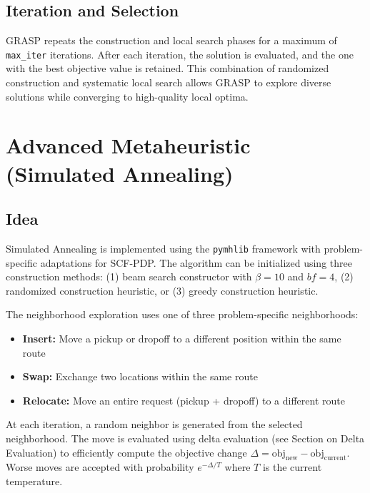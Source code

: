 \documentclass[a4paper]{scrartcl}
\begin{document}
\subsection{Iteration and Selection}
GRASP repeats the construction and local search phases for a maximum of \texttt{max\_iter} iterations. After each iteration, the solution is evaluated, and the one with the best objective value is retained. This combination of randomized construction and systematic local search allows GRASP to explore diverse solutions while converging to high-quality local optima.



\section{Advanced Metaheuristic (Simulated Annealing)}

\subsection{Idea}
Simulated Annealing is implemented using the \texttt{pymhlib} framework with problem-specific adaptations for SCF-PDP. The algorithm can be initialized using three construction methods: (1) beam search constructor with $\beta=10$ and $bf=4$, (2) randomized construction heuristic, or (3) greedy construction heuristic.

The neighborhood exploration uses one of three problem-specific neighborhoods:
\begin{itemize}
  \item \textbf{Insert:} Move a pickup or dropoff to a different position within the same route
  \item \textbf{Swap:} Exchange two locations within the same route
  \item \textbf{Relocate:} Move an entire request (pickup + dropoff) to a different route
\end{itemize}

At each iteration, a random neighbor is generated from the selected neighborhood. The move is evaluated using delta evaluation (see Section on Delta Evaluation) to efficiently compute the objective change $\Delta = \text{obj}_{\text{new}} - \text{obj}_{\text{current}}$. Worse moves are accepted with probability $e^{-\Delta/T}$ where $T$ is the current temperature.
\end{document}
